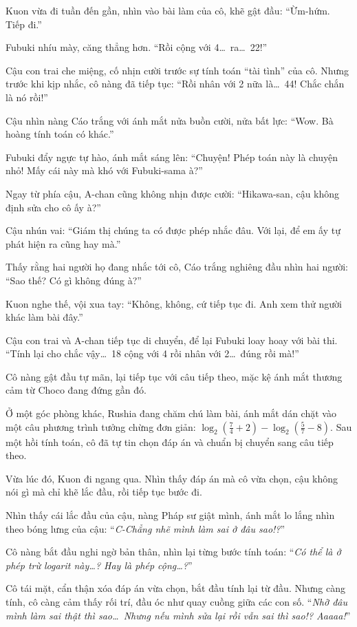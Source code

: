 \documentclass[../main.tex]{subfiles}
\begin{document}
Kuon vừa đi tuần đến gần, nhìn vào bài làm của cô, khẽ gật đầu: ``Ừm-hứm. Tiếp đi.''

Fubuki nhíu mày, căng thẳng hơn. ``Rồi cộng với 4\dots\ ra\dots\ 22!''

Cậu con trai che miệng, cố nhịn cười trước sự tính toán ``tài tình'' của cô. Nhưng trước khi kịp nhắc, cô nàng đã tiếp tục: ``Rồi nhân với 2 nữa là\dots\ 44! Chắc chắn là nó rồi!''

Cậu nhìn nàng Cáo trắng với ánh mắt nửa buồn cười, nửa bất lực: ``Wow. Bà hoàng tính toán có khác.''

Fubuki đẩy ngực tự hào, ánh mắt sáng lên: ``Chuyện! Phép toán này là chuyện nhỏ! Mấy cái này mà khó với Fubuki-sama à?''

Ngay từ phía cậu, A-chan cũng không nhịn được cười: ``Hikawa-san, cậu không định sửa cho cô ấy à?''

Cậu nhún vai: ``Giám thị chúng ta có được phép nhắc đâu. Với lại, để em ấy tự phát hiện ra cũng hay mà.''

Thấy rằng hai người họ đang nhắc tới cô, Cáo trắng nghiêng đầu nhìn hai người: ``Sao thế? Có gì không đúng à?''

Kuon nghe thế, vội xua tay: ``Không, không, cứ tiếp tục đi. Anh xem thử người khác làm bài đây.''

Cậu con trai và A-chan tiếp tục di chuyển, để lại Fubuki loay hoay với bài thi. ``Tính lại cho chắc vậy\dots\ 18 cộng với 4 rồi nhân với 2\dots\ đúng rồi mà!''

Cô nàng gật đầu tự mãn, lại tiếp tục với câu tiếp theo, mặc kệ ánh mắt thương cảm từ Choco đang đứng gần đó.

\ct

Ở một góc phòng khác, Rushia đang chăm chú làm bài, ánh mắt dán chặt vào một câu phương trình tưởng chừng đơn giản: \(\log_2\left(\frac{7}{4} + 2\right) - \log_2\left(\frac{5}{7} - 8\right)\). Sau một hồi tính toán, cô đã tự tin chọn đáp án và chuẩn bị chuyển sang câu tiếp theo.

Vừa lúc đó, Kuon đi ngang qua. Nhìn thấy đáp án mà cô vừa chọn, cậu không nói gì mà chỉ khẽ lắc đầu, rồi tiếp tục bước đi.

Nhìn thấy cái lắc đầu của cậu, nàng Pháp sư giật mình, ánh mắt lo lắng nhìn theo bóng lưng của cậu: ``\textit{C-Chẳng nhẽ mình làm sai ở đâu sao!?}''

Cô nàng bắt đầu nghi ngờ bản thân, nhìn lại từng bước tính toán: ``\textit{Có thể là ở phép trừ logarit này\dots? Hay là phép cộng\dots?}''

Cô tái mặt, cẩn thận xóa đáp án vừa chọn, bắt đầu tính lại từ đầu. Nhưng càng tính, cô càng cảm thấy rối trí, đầu óc như quay cuồng giữa các con số. ``\textit{Nhỡ đâu mình làm sai thật thì sao\dots\ Nhưng nếu mình sửa lại rồi vẫn sai thì sao!? Aaaaa!}''
\end{document}
